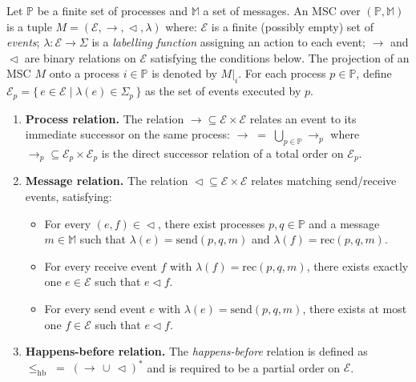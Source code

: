 \begin{definition}
Let $\mathbb{P}$ be a finite set of processes and $\mathbb{M}$ a set of messages.  
An MSC over $(\mathbb{P}, \mathbb{M})$ is a tuple
$M = (\mathcal{E}, \rightarrow, \vartriangleleft, \lambda)$ where:
$\mathcal{E}$ is a finite (possibly empty) set of \emph{events};
$\lambda : \mathcal{E} \to \Sigma$ is a \emph{labelling function} assigning an action to each event;
$\rightarrow$ and $\vartriangleleft$ are binary relations on $\mathcal{E}$ satisfying the conditions below.
The projection of an MSC $M$ onto a process $i \in \mathbb{P}$ is denoted by $M|_i$.
For each process $p \in \mathbb{P}$, define
$\mathcal{E}_p = \{\, e \in \mathcal{E} \mid \lambda(e) \in \Sigma_p \,\}$
as the set of events executed by $p$.
\begin{enumerate}
    \item \textbf{Process relation.}  
    The relation $\rightarrow \subseteq \mathcal{E} \times \mathcal{E}$ relates an event to its immediate successor on the same process:
    $\rightarrow \;=\; \bigcup_{p \in \mathbb{P}} \rightarrow_p$
    where $\rightarrow_p \subseteq \mathcal{E}_p \times \mathcal{E}_p$ is the direct successor relation of a total order on $\mathcal{E}_p$.

    \item \textbf{Message relation.}  
    The relation $\vartriangleleft \subseteq \mathcal{E} \times \mathcal{E}$ relates matching send/receive events, satisfying:
    \begin{itemize}
        \item For every $(e,f) \in \vartriangleleft$, there exist processes $p,q \in \mathbb{P}$ and a message $m \in \mathbb{M}$ such that  
        $\lambda(e) = \mathrm{send}(p,q,m)$ and $\lambda(f) = \mathrm{rec}(p,q,m)$.
        \item For every receive event $f$ with $\lambda(f) = \mathrm{rec}(p,q,m)$, there exists exactly one $e \in \mathcal{E}$ such that $e \vartriangleleft f$.
        \item For every send event $e$ with $\lambda(e) = \mathrm{send}(p,q,m)$, there exists at most one $f \in \mathcal{E}$ such that $e \vartriangleleft f$.
    \end{itemize}

    \item \textbf{Happens-before relation.}  
    The \emph{happens-before} relation is defined as
    $\le_{\mathrm{hb}} \;=\; (\rightarrow \,\cup\, \vartriangleleft)^{*}$
    and is required to be a partial order on $\mathcal{E}$.
\end{enumerate}
\end{definition}


